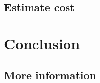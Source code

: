 \documentclass{report}
\begin{document}
\section{Estimate cost}

\chapter{Conclusion}

\section{More information}

{
\small


}



\end{document}
